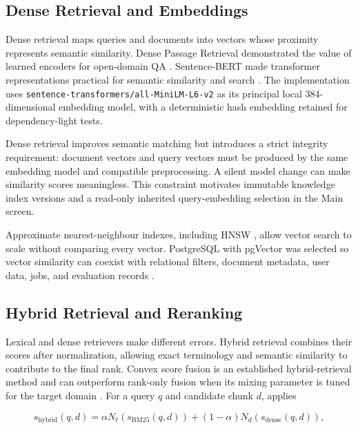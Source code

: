 \subsection{Dense Retrieval and Embeddings}

Dense retrieval maps queries and documents into vectors whose proximity
represents semantic similarity. Dense Passage Retrieval demonstrated the value
of learned encoders for open-domain QA \cite{karpukhin2020dpr}. Sentence-BERT
made transformer representations practical for semantic similarity and search
\cite{reimers2019sentencebert}. The implementation uses
\texttt{sentence-transformers/all-MiniLM-L6-v2} as its principal local
384-dimensional embedding model, with a deterministic hash embedding retained
for dependency-light tests.

Dense retrieval improves semantic matching but introduces a strict integrity
requirement: document vectors and query vectors must be produced by the same
embedding model and compatible preprocessing. A silent model change can make
similarity scores meaningless. This constraint motivates immutable knowledge
index versions and a read-only inherited query-embedding selection in the Main
screen.

Approximate nearest-neighbour indexes, including HNSW
\cite{malkov2018hnsw}, allow vector search to scale without comparing every
vector. PostgreSQL with pgVector was selected so vector similarity can coexist
with relational filters, document metadata, user data, jobs, and evaluation
records \cite{pgvector2026,postgresql2026}.

\subsection{Hybrid Retrieval and Reranking}

Lexical and dense retrievers make different errors. Hybrid retrieval combines
their scores after normalization, allowing exact terminology and semantic
similarity to contribute to the final rank. Convex score fusion is an
established hybrid-retrieval method and can outperform rank-only fusion when
its mixing parameter is tuned for the target domain \cite{bruch2024fusion}.
For a query $q$ and candidate chunk $d$, \SystemName{} applies

\begin{equation}
  s_{\mathrm{hybrid}}(q,d)
  = \alpha N_{\ell}\!\left(s_{\mathrm{BM25}}(q,d)\right)
  + (1-\alpha)N_{d}\!\left(s_{\mathrm{dense}}(q,d)\right),
  \label{eq:hybrid-score-fusion}
\end{equation}

